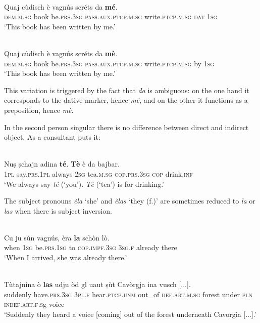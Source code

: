 \ea
\label{}
\\
\gll Quaj cùdisch è vagnús scréts da \textbf{mé}.\\
\textsc{dem.m.sg} book be.\textsc{prs.3sg} \textsc{pass.aux.ptcp.m.sg} write.\textsc{ptcp.m.sg} \textsc{dat} \textsc{1sg}\\
\glt `This book has been written by me.'
\z

\ea
\label{}
\\
\gll Quaj cùdisch è vagnús scréts da \textbf{mè}.\\
\textsc{dem.m.sg} book be.\textsc{prs.3sg} \textsc{pass.aux.ptcp.m.sg} write.\textsc{ptcp.m.sg} by \textsc{1sg}\\
\glt `This book has been written by me.'
\z

This variation is triggered by the fact that \textit{da} is ambiguous: on the one hand it corresponds to the dative marker, hence \textit{mé}, and on the other it functions as a preposition, hence \textit{mè}.

In the second person singular there is no difference between direct and indirect object. As a consultant puts it:

\ea
\label{}
\\
\gll  Nuṣ ṣchajn adina \textbf{té}. \textbf{Tè} è da bajbar.\\
\textsc{1pl} say.\textsc{prs.1pl} always \textsc{2sg} tea.\textsc{m.sg} \textsc{cop.prs.3sg} \textsc{cop} drink.\textsc{inf}\\
\glt `We always say \textit{té} (`you'). \textit{Tè} (`tea') is for drinking.'
\z

The subject pronouns \textit{èla} `she' and \textit{èlas} `they (f.)' are sometimes reduced to \textit{la} or \textit{las} when there is subject inversion.

\ea
\label{}
\\
\gll Cu ju sùn vagnús, èra \textbf{la} schòn lò.\\
when \textsc{1sg} be.\textsc{prs.1sg} to \textsc{cop.impf.3sg} \textsc{3sg.f} already there\\
\glt `When I arrived, she was already there.'
\z

\ea
\label{}
\\
\gll Tùtajnina ò \textbf{las} udju òd gl uaut ṣùt Cavòrgja ina vusch [...].\\
suddenly have.\textsc{prs.3sg} \textsc{3pl.f} hear.\textsc{ptcp.unm} out\_of \textsc{def.art.m.sg} forest under \textsc{pln} \textsc{indef.art.f.s}g voice\\
\glt `Suddenly they heard a voice [coming] out of the forest underneath Cavorgia [...].'
\z

